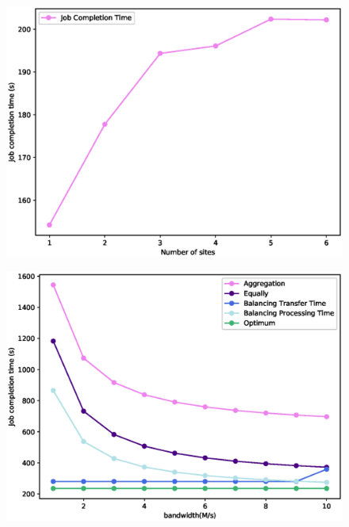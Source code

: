 \documentclass[base.tex]{subfiles}
\begin{document}
\begin{figure}[htbp]
\centering
\includegraphics[scale=0.5]{single}
\caption{}%
\label{single}
\end{figure}

\begin{figure}[htbp]
\centering
\includegraphics[scale=0.5]{Bandwidth}
\caption{}%
\label{bandwidth}
\end{figure}
\end{document}

